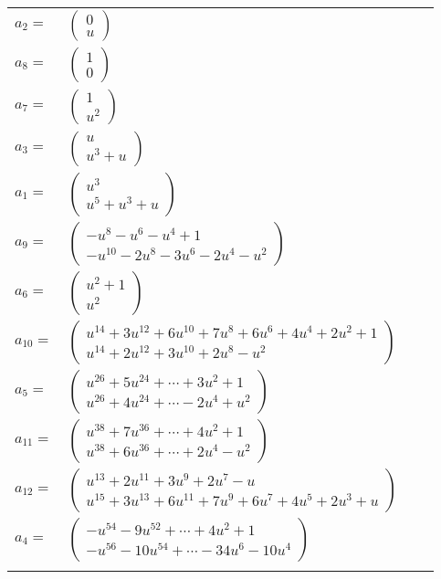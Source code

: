 \documentclass[1p]{elsarticle_modified}
\theoremstyle{definition}
\begin{document}
\begin{tabular}{m{7pt} m{180pt} m{7pt} m{180pt} }
\flushright $a_{2}=$&$\begin{pmatrix}0\\u\end{pmatrix}$ \\
\flushright $a_{8}=$&$\begin{pmatrix}1\\0\end{pmatrix}$ \\
\flushright $a_{7}=$&$\begin{pmatrix}1\\u^2\end{pmatrix}$ \\
\flushright $a_{3}=$&$\begin{pmatrix}u\\u^3+u\end{pmatrix}$ \\
\flushright $a_{1}=$&$\begin{pmatrix}u^3\\u^5+u^3+u\end{pmatrix}$ \\
\flushright $a_{9}=$&$\begin{pmatrix}- u^8- u^6- u^4+1\\- u^{10}-2 u^8-3 u^6-2 u^4- u^2\end{pmatrix}$ \\
\flushright $a_{6}=$&$\begin{pmatrix}u^2+1\\u^2\end{pmatrix}$ \\
\flushright $a_{10}=$&$\begin{pmatrix}u^{14}+3 u^{12}+6 u^{10}+7 u^8+6 u^6+4 u^4+2 u^2+1\\u^{14}+2 u^{12}+3 u^{10}+2 u^8- u^2\end{pmatrix}$ \\
\flushright $a_{5}=$&$\begin{pmatrix}u^{26}+5 u^{24}+\cdots+3 u^2+1\\u^{26}+4 u^{24}+\cdots-2 u^4+u^2\end{pmatrix}$ \\
\flushright $a_{11}=$&$\begin{pmatrix}u^{38}+7 u^{36}+\cdots+4 u^2+1\\u^{38}+6 u^{36}+\cdots+2 u^4- u^2\end{pmatrix}$ \\
\flushright $a_{12}=$&$\begin{pmatrix}u^{13}+2 u^{11}+3 u^9+2 u^7- u\\u^{15}+3 u^{13}+6 u^{11}+7 u^9+6 u^7+4 u^5+2 u^3+u\end{pmatrix}$ \\
\flushright $a_{4}=$&$\begin{pmatrix}- u^{54}-9 u^{52}+\cdots+4 u^2+1\\- u^{56}-10 u^{54}+\cdots-34 u^6-10 u^4\end{pmatrix}$\\&\end{tabular}
\end{document}
